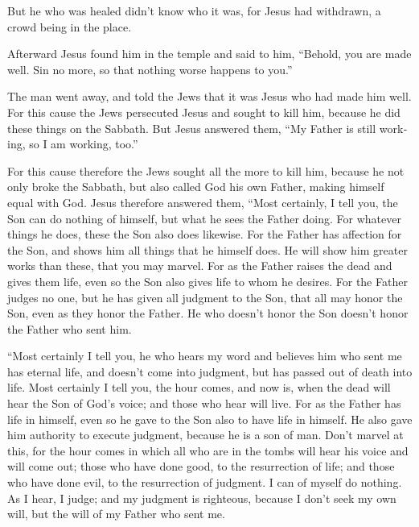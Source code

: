 \begin{paracol}{2}
\begin{otherlanguage}{english}
 But he who was healed didn't know who it was, for Jesus
had withdrawn, a crowd being in the place.

 Afterward Jesus found him in the temple and said to him,
``Behold, you are made well. Sin no more, so that nothing worse happens
to you.''

 The man went away, and told the Jews that it was Jesus
who had made him well.  For this cause the Jews
persecuted Jesus and sought to kill him, because he did these things on
the Sabbath.  But Jesus answered them, ``My Father is
still working, so I am working, too.''

 For this cause therefore the Jews sought all the more to
kill him, because he not only broke the Sabbath, but also called God his
own Father, making himself equal with God.  Jesus
therefore answered them, ``Most certainly, I tell you, the Son can do
nothing of himself, but what he sees the Father doing. For whatever
things he does, these the Son also does likewise.  For
the Father has affection for the Son, and shows him all things that he
himself does. He will show him greater works than these, that you may
marvel.  For as the Father raises the dead and gives them
life, even so the Son also gives life to whom he desires.
 For the Father judges no one, but he has given all
judgment to the Son,  that all may honor the Son, even as
they honor the Father. He who doesn't honor the Son doesn't honor the
Father who sent him.

 ``Most certainly I tell you, he who hears my word and
believes him who sent me has eternal life, and doesn't come into
judgment, but has passed out of death into life.  Most
certainly I tell you, the hour comes, and now is, when the dead will
hear the Son of God's voice; and those who hear will live.
 For as the Father has life in himself, even so he gave
to the Son also to have life in himself.  He also gave
him authority to execute judgment, because he is a son of man.
 Don't marvel at this, for the hour comes in which all
who are in the tombs will hear his voice  and will come
out; those who have done good, to the resurrection of life; and those
who have done evil, to the resurrection of judgment.  I
can of myself do nothing. As I hear, I judge; and my judgment is
righteous, because I don't seek my own will, but the will of my Father
who sent me.


\end{otherlanguage}
\end{paracol}
